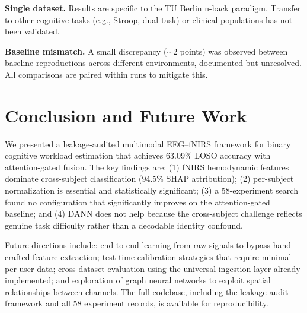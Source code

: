 \documentclass[conference]{IEEEtran}
\begin{document}
\textbf{Single dataset.} Results are specific to the TU Berlin n-back paradigm. Transfer to other cognitive tasks (e.g., Stroop, dual-task) or clinical populations has not been validated.

\textbf{Baseline mismatch.} A small discrepancy ($\sim$2 points) was observed between baseline reproductions across different environments, documented but unresolved. All comparisons are paired within runs to mitigate this.


\section{Conclusion and Future Work}

We presented a leakage-audited multimodal EEG--fNIRS framework for binary cognitive workload estimation that achieves 63.09\% LOSO accuracy with attention-gated fusion. The key findings are: (1) fNIRS hemodynamic features dominate cross-subject classification (94.5\% SHAP attribution); (2) per-subject normalization is essential and statistically significant; (3) a 58-experiment search found no configuration that significantly improves on the attention-gated baseline; and (4) DANN does not help because the cross-subject challenge reflects genuine task difficulty rather than a decodable identity confound.

Future directions include: end-to-end learning from raw signals to bypass hand-crafted feature extraction; test-time calibration strategies that require minimal per-user data; cross-dataset evaluation using the universal ingestion layer already implemented; and exploration of graph neural networks to exploit spatial relationships between channels. The full codebase, including the leakage audit framework and all 58 experiment records, is available for reproducibility.



\end{document}
